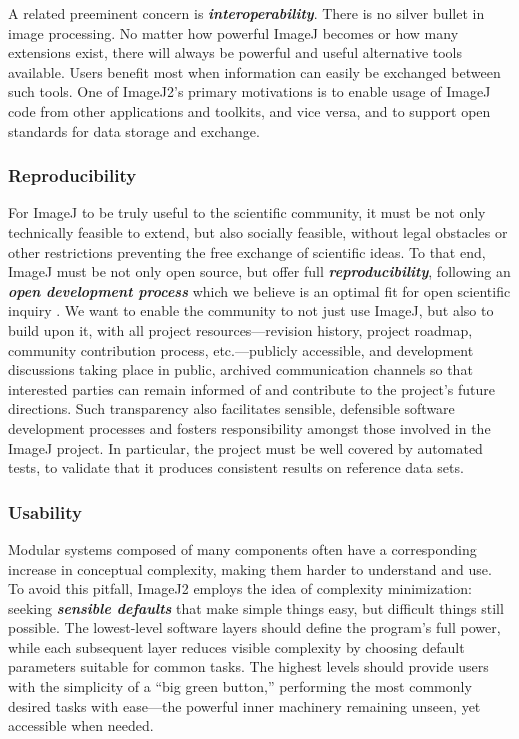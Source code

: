 \documentclass{bmcart}
\begin{document}
A related preeminent concern is \textbf{\textit{interoperability}}. There is no
silver bullet in image processing. No matter how powerful ImageJ becomes or how
many extensions exist, there will always be powerful and useful alternative
tools available. Users benefit most when information can easily be exchanged
between such tools. One of ImageJ2's primary motivations is to enable usage of
ImageJ code from other applications and toolkits, and vice versa, and to
support open standards for data storage and exchange.

\subsubsection*{Reproducibility}
For ImageJ to be truly useful to the scientific community, it must be not only
technically feasible to extend, but also socially feasible, without legal
obstacles or other restrictions preventing the free exchange of scientific
ideas. To that end, ImageJ must be not only open source, but offer full
\textbf{\textit{reproducibility}}, following an \textbf{\textit{open
development process}} which we believe is an optimal fit for open scientific
inquiry \cite{software_usability}. We want to enable the community to not just
use ImageJ, but also to build upon it, with all project resources---revision
history, project roadmap, community contribution process, etc.---publicly
accessible, and development discussions taking place in public, archived
communication channels so that interested parties can remain informed of and
contribute to the project's future directions. Such transparency also
facilitates sensible, defensible software development processes and fosters
responsibility amongst those involved in the ImageJ project. In particular,
the project must be well covered by automated tests, to validate that it
produces consistent results on reference data sets.

\subsubsection*{Usability}
Modular systems composed of many components often have a corresponding increase
in conceptual complexity, making them harder to understand and use. To avoid
this pitfall, ImageJ2 employs the idea of complexity minimization: seeking
\textbf{\textit{sensible defaults}} that make simple things easy, but difficult
things still possible. The lowest-level software layers should define the
program's full power, while each subsequent layer reduces visible complexity by
choosing default parameters suitable for common tasks. The highest levels
should provide users with the simplicity of a ``big green button,'' performing
the most commonly desired tasks with ease---the powerful inner machinery
remaining unseen, yet accessible when needed.
\end{document}
